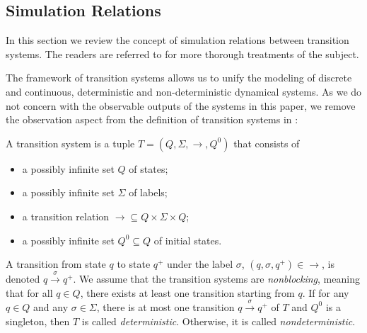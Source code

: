\subsection{Simulation Relations} %
\label{sec:abstraction:simulation}

In this section we review the concept of simulation relations between
transition systems. The readers are referred to \cite{girardetal07amd,aluretal00dah} for more thorough treatments of the subject.

The framework of transition systems allows us to unify the modeling of
discrete and continuous, deterministic and non-deterministic dynamical
systems. As we do not concern with the observable outputs of the systems in
this paper, we remove the observation aspect from the definition of transition
systems in {\cite{girardetal07amd}}:
      \vspace{-5pt}
\begin{definition}
  \label{thm:transition-systems-def}
  A transition system is a tuple $T = (Q, \Sigma, \rightarrow, Q^0)$ that
  consists of
        \vspace{-5pt}
  \begin{itemize}
  \item a possibly infinite set $Q$ of states;
      \vspace{-5pt}
  \item a possibly infinite set $\Sigma$ of labels;
      \vspace{-5pt}
  \item a transition relation $\rightarrow \subseteq Q \times \Sigma \times
    Q$;
          \vspace{-5pt}
  \item a possibly infinite set $Q^0 \subseteq Q$ of initial states.
  \end{itemize}
\end{definition}

A transition from state $q$ to state $q^+$ under the label $\sigma$, {\ie}
$(q, \sigma, q^+) \in \rightarrow$, is denoted $q \xrightarrow{\sigma} q^+$.
We assume that the transition systems are {\emph{nonblocking}}, meaning that
for all $q \in Q$, there exists at least one transition starting from $q$. If
for any $q \in Q$ and any $\sigma \in \Sigma$, there is at most one transition
$q \xrightarrow{\sigma} q^+$ of $T$ and $Q^0$ is a singleton, then $T$ is
called {\emph{deterministic}}. Otherwise, it is called
{\emph{nondeterministic}}.

